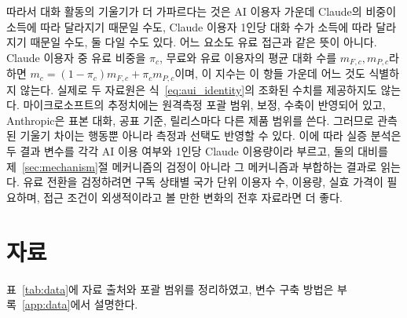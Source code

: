 \documentclass[11pt]{article}
\theoremstyle{definition}
\theoremstyle{remark}
\begin{document}
따라서 대화 활동의 기울기가 더 가파르다는 것은 AI 이용자 가운데 Claude의 비중이
소득에 따라 달라지기 때문일 수도, Claude 이용자 1인당 대화 수가 소득에 따라 달라지기 때문일 수도, 둘 다일 수도 있다.
어느 요소도 유료 접근과 같은 뜻이 아니다. Claude 이용자 중 유료 비중을 $\pi_c$, 무료와 유료 이용자의 평균 대화 수를 $m_{F,c},m_{P,c}$라 하면 $m_c=(1-\pi_c)m_{F,c}+\pi_cm_{P,c}$이며, 이 지수는 이 항들 가운데 어느 것도 식별하지 않는다. 실제로 두 자료원은 식~\eqref{eq:aui_identity}의 조화된 수치를 제공하지도 않는다. 마이크로소프트의 추정치에는 원격측정 포괄 범위, 보정, 수축이 반영되어 있고, Anthropic은 표본 대화, 공표 기준, 릴리스마다 다른 제품 범위를 쓴다. 그러므로 관측된 기울기 차이는 행동뿐 아니라 측정과 선택도 반영할 수 있다. 이에 따라 실증 분석은 두 결과 변수를 각각 AI 이용 여부와 1인당 Claude 이용량이라 부르고, 둘의 대비를 제~\ref{sec:mechanism}절 메커니즘의 검정이 아니라 그 메커니즘과 부합하는 결과로 읽는다. 유료 전환을 검정하려면 구독 상태별 국가 단위 이용자 수, 이용량, 실효 가격이 필요하며, 접근 조건이 외생적이라고 볼 만한 변화의 전후 자료라면 더 좋다.


\section{자료}\label{sec:data}

표~\ref{tab:data}에 자료 출처와 포괄 범위를 정리하였고, 변수 구축 방법은 부록~\ref{app:data}에서 설명한다.
\end{document}
